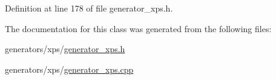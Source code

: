 Definition at line 178 of file generator\+\_\+xps.\+h.



The documentation for this class was generated from the following files\+:\begin{DoxyCompactItemize}
\item 
generators/xps/\hyperlink{generator__xps_8h}{generator\+\_\+xps.\+h}\item 
generators/xps/\hyperlink{generator__xps_8cpp}{generator\+\_\+xps.\+cpp}\end{DoxyCompactItemize}
